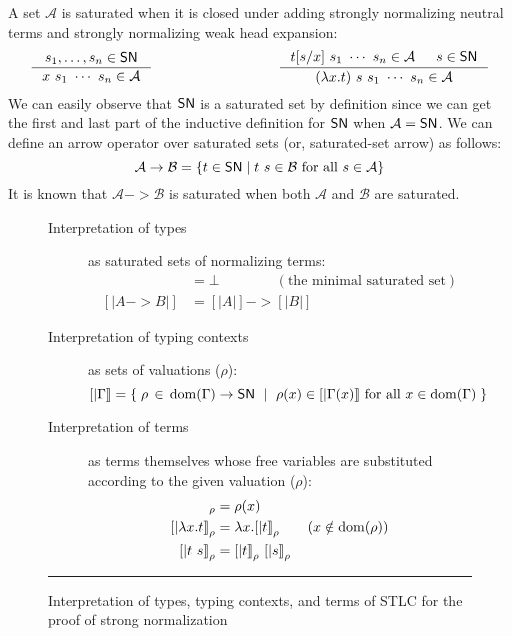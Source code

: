 A set $\mathcal{A}$ is saturated when it is closed under adding
strongly normalizing neutral terms and strongly normalizing weak head expansion:
\[
\inference{s_1,\ldots,s_n\in\SN}{x~s_1~\cdots~s_n \in \mathcal{A}}
\qquad\qquad\qquad\qquad\quad
\inference{t[s/x]~s_1~\cdots~s_n\in \mathcal{A} & s\in\SN}
	  {(\l x.t)~s~s_1~\cdots~s_n \in \mathcal{A}}
\]
We can easily observe that $\mathsf{SN}$ is a saturated set by definition
since we can get the first and last part of the inductive definition for $\mathsf{SN}$
when $\mathcal{A}=\mathsf{SN}$. We can define an arrow operator over saturated sets
(or, saturated-set arrow) as follows:
\[ \mathcal{A} -> \mathcal{B} = \{ t \in \mathsf{SN} \mid t~s \in \mathcal{B} ~\text{for all}~ s \in \mathcal{A} \} \]
It is known that $\mathcal{A} -> \mathcal{B}$ is saturated
when both $\mathcal{A}$ and $\mathcal{B}$ are saturated.

\begin{figure}
\begin{singlespace}
\begin{description}
\item[Interpretation of types] as saturated sets of normalizing terms:
\begin{align*}
[| \iota  |] &= \bot \qquad\qquad (\text{the minimal saturated set}) \\
[| A -> B |] &= [| A |] -> [| B |]
\end{align*}

\item[Interpretation of typing contexts] as sets of valuations ($\rho$):
\[ [| \Gamma |] =
	\{\; \rho\,\in\,\mathop{\mathrm{dom}}(\Gamma) -> \mathsf{SN} ~\mid~
             \rho(x) \in [|\Gamma(x)|] ~\text{for all}~x\in\mathop{\mathrm{dom}}(\Gamma) \;\}
\]

\item[Interpretation of terms] as terms themselves whose free variables are
	substituted according to the given valuation ($\rho$):
\begin{align*}
[|x|]_\rho      &= \rho(x) \\
[|\l x.t|]_\rho &= \l x.[|t|]_\rho  \qquad (x\notin\dom(\rho)) \\
[|t~s|]_\rho    &= [|t|]_\rho~[|s|]_\rho
\end{align*}
\end{description}
\caption[Interpretation of STLC for proving strong normalization]
	{Interpretation of types, typing contexts, and terms of STLC
         for the proof of strong normalization}
\label{fig:interpSTLC}
\end{singlespace}
\vspace*{.5em}\hrule
\end{figure}

